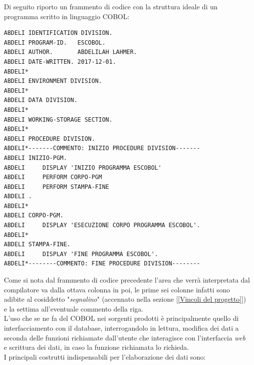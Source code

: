 Di seguito riporto un frammento di codice con la struttura ideale di un programma scritto in linguaggio COBOL:

\begin{lstlisting}[language=cobol, caption={Struttura ideale di un programma COBOL}]
ABDELI IDENTIFICATION DIVISION.
ABDELI PROGRAM-ID.   ESCOBOL.
ABDELI AUTHOR.       ABDELILAH LAHMER.
ABDELI DATE-WRITTEN. 2017-12-01.
ABDELI*
ABDELI ENVIRONMENT DIVISION.
ABDELI*
ABDELI DATA DIVISION.
ABDELI*
ABDELI WORKING-STORAGE SECTION.                         
ABDELI*
ABDELI PROCEDURE DIVISION.
ABDELI*-------COMMENTO: INIZIO PROCEDURE DIVISION-------
ABDELI INIZIO-PGM.
ABDELI     DISPLAY 'INIZIO PROGRAMMA ESCOBOL'
ABDELI 	   PERFORM CORPO-PGM
ABDELI     PERFORM STAMPA-FINE
ABDELI .
ABDELI*
ABDELI CORPO-PGM.
ABDELI     DISPLAY 'ESECUZIONE CORPO PROGRAMMA ESCOBOL'.
ABDELI*
ABDELI STAMPA-FINE.
ABDELI     DISPLAY 'FINE PROGRAMMA ESCOBOL'.
ABDELI*--------COMMENTO: FINE PROCEDURE DIVISION--------
\end{lstlisting}

Come si nota dal frammento di codice precedente l'area che verrà interpretata dal compilatore va dalla ottava colonna in poi, le prime sei colonne infatti sono adibite al cosiddetto "\textit{segnalino}" (accennato nella sezione [\ref{Vincoli del progetto}]) e la settima all'eventuale commento della riga.\\


L'uso che se ne fa del COBOL nei sorgenti prodotti è principalmente quello di interfacciamento con il database, interrogandolo in lettura, modifica dei dati a seconda delle funzioni richiamate dall'utente che interagisce con l'interfaccia \textit{web} e scrittura dei dati, in caso la funzione richiamata lo richieda.\\

I principali costrutti indispensabili per l'elaborazione dei dati sono:

